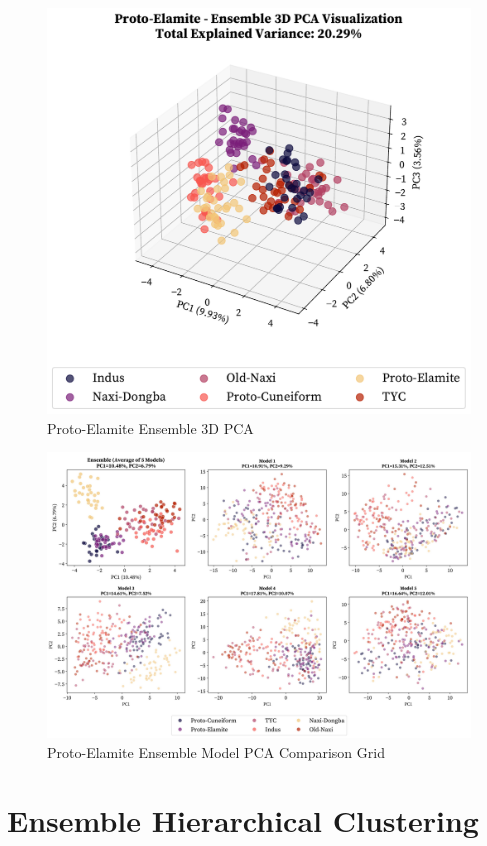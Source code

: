 \documentclass[11pt,a4paper,oneside]{report}
\begin{document}
\begin{figure}[H] 
    \centering
    \includegraphics[width=0.8\linewidth]{Visualizations/PCA/Proto-Elamite/ensemble_pca_3d.pdf}
     \caption*{Proto-Elamite Ensemble 3D PCA}
\end{figure}

\begin{figure}[H] 
    \centering
    \includegraphics[width=1\linewidth]{Visualizations/PCA/Proto-Elamite/model_comparison_grid_pca.pdf}
     \caption*{Proto-Elamite Ensemble Model PCA Comparison Grid}
\end{figure}

\clearpage
\section{Ensemble Hierarchical Clustering}
\label{app: dendro}
\end{document}
